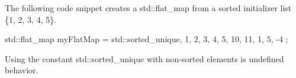 The following code snippet creates a std::flat\_map from a sorted initializer list \{1, 2, 3, 4, 5\}.

\begin{cpp}
std::flat_map myFlatMap = { std::sorted_unique, {1, 2, 3, 4, 5}, {10, 11, 1, 5, -4} };
\end{cpp}

Using the constant std::sorted\_unique with non-sorted elements is undefined behavior.













